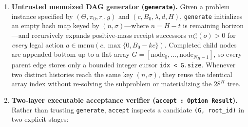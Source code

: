 \documentclass[11pt,letterpaper]{article}
\providecommand{\tightlist}{\setlength{\itemsep}{2pt}\setlength{\parskip}{0pt}}
\begin{document}
\begin{enumerate}
\def\labelenumi{\arabic{enumi}.}
\tightlist
\item
  \textbf{Untrusted memoized DAG generator (\texttt{generate}).} Given a
  problem instance specified by \((\Theta, \pi_0, r_\cdot, g)\) and
  \((c, B_0, \lambda, d, H)\), \texttt{generate} initializes an empty
  hash map keyed by \((n, \sigma)\)---where \(n = H - t\) is remaining
  horizon---and recursively expands positive-mass receipt successors
  \(m_\sigma^a(o) > 0\) for \emph{every} legal action
  \(a \in \mathrm{menu}(c, \max\{0, B_0 - kc\})\). Completed child nodes
  are appended bottom-up to a flat array
  \(G = [\mathrm{node}_0, \dots, \mathrm{node}_{N_H - 1}]\), so every
  parent edge stores only a bounded integer cursor
  \texttt{idx\ \textless{}\ G.size}. Whenever two distinct histories
  reach the same key \((n, \sigma)\), they reuse the identical array
  index without re-solving the subproblem or materializing the \(28^H\)
  tree.
\item
  \textbf{Two-layer executable acceptance verifier
  (\texttt{accept\ :\ Option\ Result}).} Rather than trusting
  \texttt{generate}, \texttt{accept} inspects a candidate
  \texttt{(G,\ root\_id)} in two explicit stages:


\end{enumerate}
\end{document}
